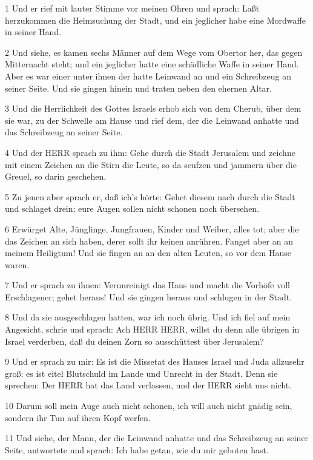 \par 1 Und er rief mit lauter Stimme vor meinen Ohren und sprach: Laßt herzukommen die Heimsuchung der Stadt, und ein jeglicher habe eine Mordwaffe in seiner Hand.
\par 2 Und siehe, es kamen sechs Männer auf dem Wege vom Obertor her, das gegen Mitternacht steht; und ein jeglicher hatte eine schädliche Waffe in seiner Hand. Aber es war einer unter ihnen der hatte Leinwand an und ein Schreibzeug an seiner Seite. Und sie gingen hinein und traten neben den ehernen Altar.
\par 3 Und die Herrlichkeit des Gottes Israels erhob sich von dem Cherub, über dem sie war, zu der Schwelle am Hause und rief dem, der die Leinwand anhatte und das Schreibzeug an seiner Seite.
\par 4 Und der HERR sprach zu ihm: Gehe durch die Stadt Jerusalem und zeichne mit einem Zeichen an die Stirn die Leute, so da seufzen und jammern über die Greuel, so darin geschehen.
\par 5 Zu jenen aber sprach er, daß ich's hörte: Gehet diesem nach durch die Stadt und schlaget drein; eure Augen sollen nicht schonen noch übersehen.
\par 6 Erwürget Alte, Jünglinge, Jungfrauen, Kinder und Weiber, alles tot; aber die das Zeichen an sich haben, derer sollt ihr keinen anrühren. Fanget aber an an meinem Heiligtum! Und sie fingen an an den alten Leuten, so vor dem Hause waren.
\par 7 Und er sprach zu ihnen: Verunreinigt das Haus und macht die Vorhöfe voll Erschlagener; gehet heraus! Und sie gingen heraus und schlugen in der Stadt.
\par 8 Und da sie ausgeschlagen hatten, war ich noch übrig. Und ich fiel auf mein Angesicht, schrie und sprach: Ach HERR HERR, willst du denn alle übrigen in Israel verderben, daß du deinen Zorn so ausschüttest über Jerusalem?
\par 9 Und er sprach zu mir: Es ist die Missetat des Hauses Israel und Juda allzusehr groß; es ist eitel Blutschuld im Lande und Unrecht in der Stadt. Denn sie sprechen: Der HERR hat das Land verlassen, und der HERR sieht uns nicht.
\par 10 Darum soll mein Auge auch nicht schonen, ich will auch nicht gnädig sein, sondern ihr Tun auf ihren Kopf werfen.
\par 11 Und siehe, der Mann, der die Leinwand anhatte und das Schreibzeug an seiner Seite, antwortete und sprach: Ich habe getan, wie du mir geboten hast.

